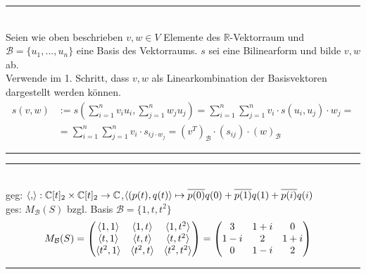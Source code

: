 \documentclass{article}
\begin{document}
{\color{blue}
\hrule
	\\
	Seien wie oben beschrieben $v,w\in V$ Elemente des $\mathbb{R}$-Vektorraum und $\mathcal{B} = \{u_1,...,u_n\}$ eine Basis des Vektorraums. $s$ sei eine Bilinearform und bilde $v,w$ ab.\\
	Verwende im 1. Schritt, dass $v,w$ als Linearkombination der Basisvektoren dargestellt werden können.
	\begin{align*}
		s(v,w) &:= s(\sum_{i=1}^n v_i u_i, \sum_{j=1}^n w_j u_j) = \sum_{i=1}^n\sum_{j=1}^n v_i\cdot s(u_i, u_j)\cdot w_j =\\
		&= \sum_{i=1}^n \sum_{j=1}^n v_i\cdot s_{ij\cdot w_j} = (v^T)_\mathcal{B}\cdot (s_{ij})\cdot (w)_\mathcal{B}
	\end{align*}
\hrule
}

\vspace{0.5cm}

{\color{blue}
\hrule
	\\
	geg: $\braket{,} : \mathbb{C}[t]_2\times \mathbb{C}[t]_2\to \mathbb{C}$,\quad $\braket{(p(t),q(t)} \mapsto \overline{p(0)}q(0) + \overline{p(1)}q(1) + \overline{p(i)}q(i)$\\
	ges: $M_\mathcal{B}(S)$ bzgl. Basis $\mathcal{B} = \{1,t,t^2\}$
	\begin{align*}
		M_\mathcal{B}(S) &=
		\begin{pmatrix}
			\braket{1,1} & \braket{1,t} & \braket{1,t^2} \\
			\braket{t,1} & \braket{t,t} & \braket{t,t^2} \\
			\braket{t^2,1} & \braket{t^2,t} & \braket{t^2,t^2} \\
		\end{pmatrix}
		=
		\begin{pmatrix}
			3 & 1+i & 0\\
			1-i & 2 & 1+i\\
			0 & 1-i & 2
		\end{pmatrix}
	\end{align*}
\hrule
}




\newpage
\end{document}
